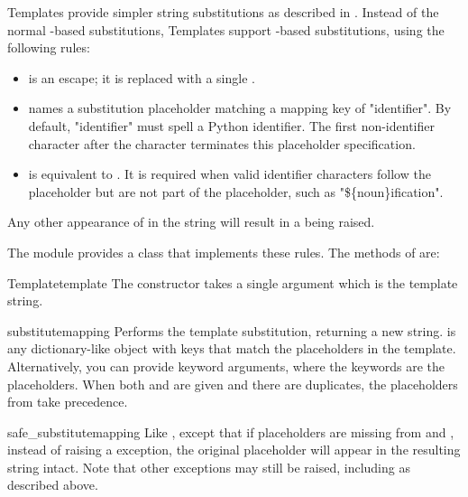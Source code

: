 Templates provide simpler string substitutions as described in .
Instead of the normal \samp{\%}-based substitutions, Templates support
\samp{\$}-based substitutions, using the following rules:

\begin{itemize}
\item \samp{\$\$} is an escape; it is replaced with a single \samp{\$}.

\item {} names a substitution placeholder matching a mapping
       key of "identifier".  By default, "identifier" must spell a Python
       identifier.  The first non-identifier character after the \samp{\$}
       character terminates this placeholder specification.

\item {} is equivalent to .  It is
      required when valid identifier characters follow the placeholder but are
      not part of the placeholder, such as "\$\{noun\}ification".
\end{itemize}

Any other appearance of \samp{\$} in the string will result in a
 being raised.


The  module provides a  class that implements
these rules.  The methods of  are:

\begin{classdesc}{Template}{template}
The constructor takes a single argument which is the template string.
\end{classdesc}

\begin{methoddesc}[Template]{substitute}{mapping}
Performs the template substitution, returning a new string.   is
any dictionary-like object with keys that match the placeholders in the
template.  Alternatively, you can provide keyword arguments, where the
keywords are the placeholders.  When both  and  are
given and there are duplicates, the placeholders from  take
precedence.
\end{methoddesc}

\begin{methoddesc}[Template]{safe_substitute}{mapping}
Like , except that if placeholders are missing from
 and , instead of raising a 
exception, the original placeholder will appear in the resulting string
intact.  Note that other exceptions may still be raised, including
 as described above.
\end{methoddesc}

